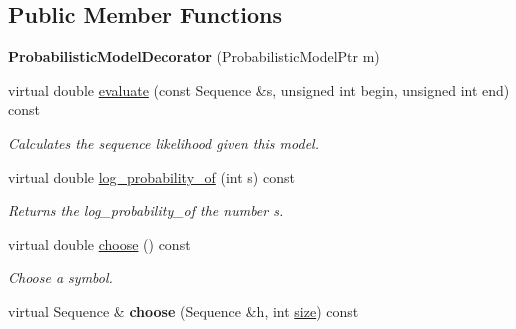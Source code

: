 \subsection*{Public Member Functions}
\begin{DoxyCompactItemize}
\item 
\mbox{\label{classtops_1_1ProbabilisticModelDecorator_ae2e1b9a1a08df28307c99ffe91efb782}} 
{\bfseries Probabilistic\+Model\+Decorator} (Probabilistic\+Model\+Ptr m)
\item 
\mbox{\label{classtops_1_1ProbabilisticModelDecorator_a51cb0d8cd86529e061fa4a6ac8774e17}} 
virtual double \hyperlink{classtops_1_1ProbabilisticModelDecorator_a51cb0d8cd86529e061fa4a6ac8774e17}{evaluate} (const Sequence \&s, unsigned int begin, unsigned int end) const
\begin{DoxyCompactList}\small\item\em Calculates the sequence likelihood given this model. \end{DoxyCompactList}\item 
\mbox{\label{classtops_1_1ProbabilisticModelDecorator_a752b42672c0d8da30a40688e19ef0b69}} 
virtual double \hyperlink{classtops_1_1ProbabilisticModelDecorator_a752b42672c0d8da30a40688e19ef0b69}{log\+\_\+probability\+\_\+of} (int s) const
\begin{DoxyCompactList}\small\item\em Returns the log\+\_\+probability\+\_\+of the number s. \end{DoxyCompactList}\item 
\mbox{\label{classtops_1_1ProbabilisticModelDecorator_a8168bf444b07139d9908fff513a08e27}} 
virtual double \hyperlink{classtops_1_1ProbabilisticModelDecorator_a8168bf444b07139d9908fff513a08e27}{choose} () const
\begin{DoxyCompactList}\small\item\em Choose a symbol. \end{DoxyCompactList}\item 
\mbox{\label{classtops_1_1ProbabilisticModelDecorator_a442006c10fcc4b62c1dfeafc5dc682c7}} 
virtual Sequence \& {\bfseries choose} (Sequence \&h, int \hyperlink{classtops_1_1ProbabilisticModel_a4e3910e9b9b848b7078e7101909ae82a}{size}) const

\end{DoxyCompactItemize}
